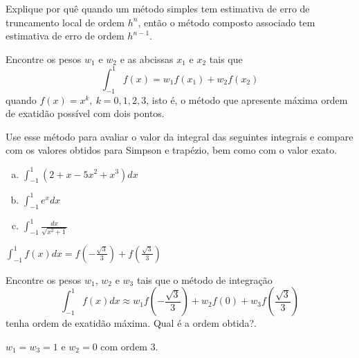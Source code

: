 \begin{exer} Explique por quê quando um método simples tem estimativa de erro de truncamento local de ordem $h^n$, então o método composto associado tem estimativa de erro de ordem $h^{n-1}$.
\end{exer}

\begin{exer} Encontre os pesos $w_1$ e $w_2$ e as abcissas $x_1$ e $x_2$ tais que
\begin{equation} \int_{-1}^1f(x)=w_1f(x_1)+w_2f(x_2) \end{equation}
quando $f(x)=x^k, ~k=0,1,2,3$, isto é, o método que apresente máxima ordem de exatidão possível com dois pontos.

Use esse método para avaliar o valor da integral das seguintes integrais e compare com os valores obtidos para Simpson e trapézio, bem como com o valor exato.
\begin{enumerate}[a)]
\item $\displaystyle \int_{-1}^1\left(2+x-5x^2+x^3\right)dx$
\item $\displaystyle \int_{-1}^1e^{x}dx$
\item $\displaystyle \int_{-1}^1\frac{dx}{\sqrt{x^2+1}}$
\end{enumerate}
\end{exer}
\begin{resp}
  $\displaystyle \int_{-1}^1f(x)dx=f\left(-\frac{\sqrt{3}}{3}\right)+f\left(\frac{\sqrt{3}}{3}\right)$
\end{resp}


\begin{exer} Encontre os pesos $w_1$, $w_2$ e $w_3$ tais que o método de integração
\begin{equation} \int_{-1}^1 f(x)dx \approx w_1 f\left(-\frac{\sqrt{3}}{3}\right)  + w_2f(0) + w_3f\left(\frac{\sqrt{3}}{3}\right) \end{equation}
tenha ordem de exatidão máxima. Qual é a ordem obtida?.
\end{exer}
\begin{resp}
  $w_1=w_3=1$ e $w_2=0$ com ordem 3.
\end{resp}


%
